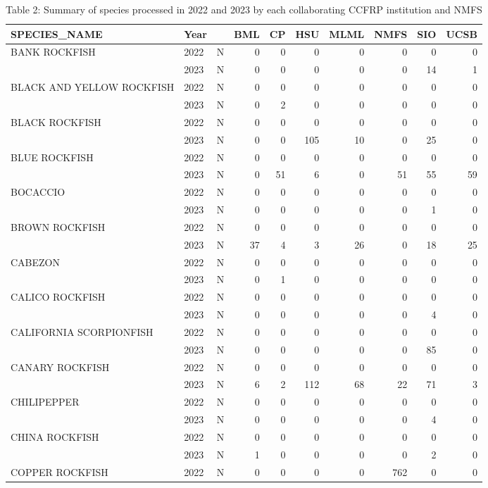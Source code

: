 \documentclass[
  letterpaper,
  DIV=11,
  numbers=noendperiod]{scrartcl}
\begin{document}
\begin{table}

\caption{Table 2: Summary of species processed in 2022 and 2023 by each collaborating CCFRP institution and NMFS}
\centering
\begin{tabular}[t]{lllrrrrrrr}
\toprule
SPECIES\_NAME & Year &   & BML & CP & HSU & MLML & NMFS & SIO & UCSB\\
\midrule
BANK ROCKFISH & 2022 & N & 0 & 0 & 0 & 0 & 0 & 0 & 0\\
 & 2023 & N & 0 & 0 & 0 & 0 & 0 & 14 & 1\\
BLACK AND YELLOW ROCKFISH & 2022 & N & 0 & 0 & 0 & 0 & 0 & 0 & 0\\
 & 2023 & N & 0 & 2 & 0 & 0 & 0 & 0 & 0\\
BLACK ROCKFISH & 2022 & N & 0 & 0 & 0 & 0 & 0 & 0 & 0\\
 & 2023 & N & 0 & 0 & 105 & 10 & 0 & 25 & 0\\
BLUE ROCKFISH & 2022 & N & 0 & 0 & 0 & 0 & 0 & 0 & 0\\
 & 2023 & N & 0 & 51 & 6 & 0 & 51 & 55 & 59\\
BOCACCIO & 2022 & N & 0 & 0 & 0 & 0 & 0 & 0 & 0\\
 & 2023 & N & 0 & 0 & 0 & 0 & 0 & 1 & 0\\
BROWN ROCKFISH & 2022 & N & 0 & 0 & 0 & 0 & 0 & 0 & 0\\
 & 2023 & N & 37 & 4 & 3 & 26 & 0 & 18 & 25\\
CABEZON & 2022 & N & 0 & 0 & 0 & 0 & 0 & 0 & 0\\
 & 2023 & N & 0 & 1 & 0 & 0 & 0 & 0 & 0\\
CALICO ROCKFISH & 2022 & N & 0 & 0 & 0 & 0 & 0 & 0 & 0\\
 & 2023 & N & 0 & 0 & 0 & 0 & 0 & 4 & 0\\
CALIFORNIA SCORPIONFISH & 2022 & N & 0 & 0 & 0 & 0 & 0 & 0 & 0\\
 & 2023 & N & 0 & 0 & 0 & 0 & 0 & 85 & 0\\
CANARY ROCKFISH & 2022 & N & 0 & 0 & 0 & 0 & 0 & 0 & 0\\
 & 2023 & N & 6 & 2 & 112 & 68 & 22 & 71 & 3\\
CHILIPEPPER & 2022 & N & 0 & 0 & 0 & 0 & 0 & 0 & 0\\
 & 2023 & N & 0 & 0 & 0 & 0 & 0 & 4 & 0\\
CHINA ROCKFISH & 2022 & N & 0 & 0 & 0 & 0 & 0 & 0 & 0\\
 & 2023 & N & 1 & 0 & 0 & 0 & 0 & 2 & 0\\
COPPER ROCKFISH & 2022 & N & 0 & 0 & 0 & 0 & 762 & 0 & 0\\

\end{tabular}
\end{table}
\end{document}
